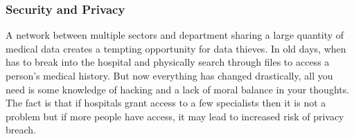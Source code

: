 \documentclass[10pt,a4paper,twoside]{article}
\begin{document}
\subsubsection*{Security and Privacy }
A network between multiple sectors and department sharing a large quantity of medical data creates a tempting opportunity for data thieves. In old days, when has to break into the hospital and physically search through files to access a person’s medical history. But now everything has changed drastically, all you need is some knowledge of hacking and a lack of moral balance in your thoughts. The fact is that if hospitals grant access to a few specialists then it is not a problem but if more people have access, it may lead to increased risk of privacy breach.  
\end{document}
